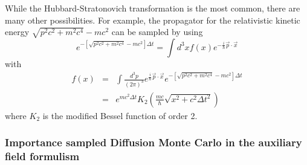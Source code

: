 While the Hubbard-Stratonovich transformation is the most common, there are
many other possibilities. For example, the propagator for the
relativistic kinetic energy
$\sqrt{p^2 c^2 + m^2 c^4}-mc^2$ can be sampled by using
\begin{equation}
e^{-\left [\sqrt{p^2 c^2 + m^2 c^4}-mc^2 \right ] \Delta t} =
\int d^3x f(x) e^{-\frac{i}{\hbar} \vec p \cdot \vec x}
\end{equation}
with
\begin{eqnarray}
f(x) &=& \int \frac{d^3p}{(2\pi)^3} e^{\frac{i}{\hbar} \vec p \cdot \vec x}
e^{-\left [\sqrt{p^2 c^2 + m^2 c^4}-mc^2 \right ] \Delta t}
\nonumber\\
&=& e^{mc^2 \Delta t}
K_2 \left ( \frac{m c}{\hbar} \sqrt{x^2+c^2 \Delta t^2} \right )
\end{eqnarray}
where $K_2$ is the modified Bessel function of order 2\cite{carlson1993}.


\subsubsection{Importance sampled Diffusion Monte Carlo in the auxiliary field
formulism}

